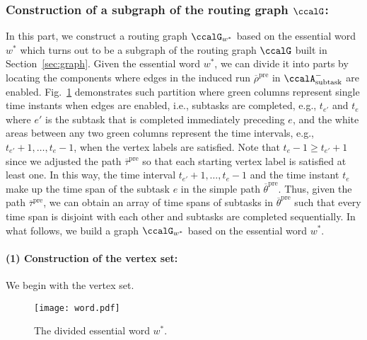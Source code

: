 \documentclass[Afour,sageh,times]{sagej}
\newcommand{\auto}[1]{\ccalA_{\textup{#1}}}
\newcounter{phase} \setcounter{phase}{0}
\newcounter{subphase}[phase] \setcounter{subphase}{0}
\begin{document}
{{\subsubsection{Construction of a subgraph of the routing graph $\ccalG$:}\label{app:graph}
In this part, we construct a routing graph $\ccalG_{w^*}$ based on the essential word $w^*$ which turns out to be a subgraph of the routing graph $\ccalG$ built in Section~\ref{sec:graph}.
Given the essential word $w^*$, we can divide it into parts by locating the components where edges in the induced run $\overline{\rho}^\text{pre}$ in $\auto{subtask}^-$ are enabled. Fig.~\ref{fig:word} demonstrates such partition where green columns represent single time instants when edges  are enabled, i.e., subtasks are completed, e.g., $t_{e'}$ and $t_{e}$ where $e'$ is the subtask that is completed immediately preceding $e$, and the white areas between any two green columns represent the time intervals, e.g., $t_{e'}+1, \ldots, t_{e}-1$, when the vertex labels are satisfied. Note that $t_{e}-1 \geq t_{e'}+1$ since we adjusted the path $\overline{\tau}^{\text{pre}}$ so that each starting vertex label is satisfied at least one. In this way,  the time interval $t_{e'}+1, \ldots, t_{e}-1$ and the time instant $t_e$ make up the time span of the  subtask $e$ in the simple path $\overline{\theta}^{\text{pre}}$. Thus, given the path $\overline{\tau}^\text{pre}$, we can obtain an array of time spans of subtasks in $\overline{\theta}^{\text{pre}}$ such that every time span is disjoint with each other and subtasks are completed sequentially. In what follows, we build a graph $\ccalG_{w^*}$ based on the essential word $w^*$.
\paragraph{(1) Construction of the vertex set:}\label{app:vertex} We begin with the vertex set.
\begin{figure}[!t]
  \centering
  \texttt{[image: word.pdf]}
  \caption{The divided essential word $w^*$.}
  \label{fig:word}
\end{figure}


 \label{app:initial}

}}
\end{document}
